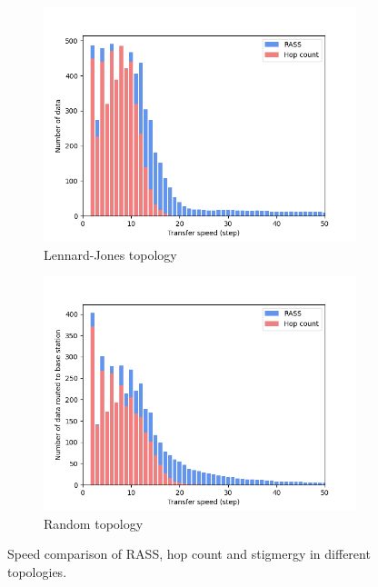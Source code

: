 \begin{figure}
\begin{subfigure}{0.45\textwidth}
        \includegraphics[width=\textwidth]{figures/dora_mesh/lennard_speed.png}
        \caption{Lennard-Jones topology}
        \label{results:lennard_100_speed}
    \end{subfigure}
    \begin{subfigure}{0.45\textwidth}
        \includegraphics[width=\textwidth]{figures/dora_mesh/random_speed.png}
        \caption{Random topology}
        \label{results:random_100_speed}
    \end{subfigure}
    \caption[RASS transfer speeds]{Speed comparison of \ac{RASS}, hop count and stigmergy in different topologies.}
    \label{results:rass_speed}
\end{figure}

